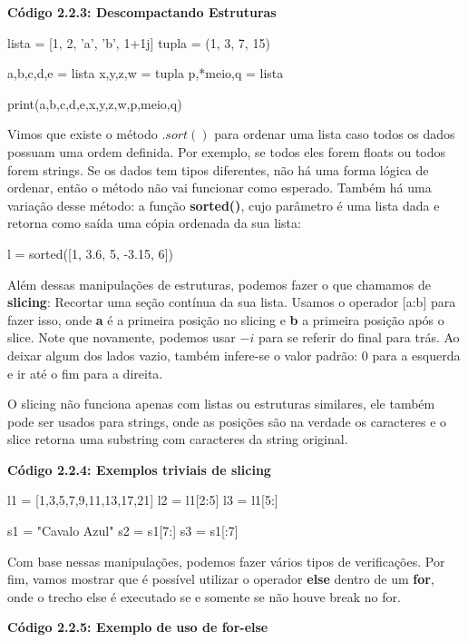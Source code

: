 \documentclass[11pt, a4paper]{article}
\begin{document}
\textbf{Código 2.2.3: Descompactando Estruturas}

\begin{code}
lista = [1, 2, 'a', 'b', 1+1j]
tupla = (1, 3, 7, 15)

a,b,c,d,e = lista
x,y,z,w = tupla
p,*meio,q = lista

print(a,b,c,d,e,x,y,z,w,p,meio,q)
\end{code}

Vimos que existe o método \(.sort()\) para ordenar uma lista caso todos os dados possuam uma ordem definida. Por exemplo, se todos eles forem floats ou todos forem strings. Se os dados tem tipos diferentes, não há uma forma lógica de ordenar, então o método não vai funcionar como esperado. Também há uma variação desse método: a função \textbf{sorted()}, cujo parâmetro é uma lista dada e retorna como saída uma cópia ordenada da sua lista:

\begin{code}
    l = sorted([1, 3.6, 5, -3.15, 6])
\end{code}

Além dessas manipulações de estruturas, podemos fazer o que chamamos de \textbf{slicing}: Recortar uma seção contínua da sua lista. Usamos o operador [a:b] para fazer isso, onde \textbf{a} é a primeira posição no slicing e \textbf{b} a primeira posição após o slice. Note que novamente, podemos usar \(-i\) para se referir do final para trás. Ao deixar algum dos lados vazio, também infere-se o valor padrão: 0 para a esquerda e ir até o fim para a direita. 

O slicing não funciona apenas com listas ou estruturas similares, ele também pode ser usados para strings, onde as posições são na verdade os caracteres e o slice retorna uma substring com caracteres da string original. 

\textbf{Código 2.2.4: Exemplos triviais de slicing}

\begin{code}
    l1 = [1,3,5,7,9,11,13,17,21]
    l2 = l1[2:5]
    l3 = l1[5:]

    s1 = "Cavalo Azul"
    s2 = s1[7:]
    s3 = s1[:7]
\end{code}

Com base nessas manipulações, podemos fazer vários tipos de verificações. Por fim, vamos mostrar que é possível utilizar o operador \textbf{else} dentro de um \textbf{for}, onde o trecho else é executado se e somente se não houve break no for.

\textbf{Código 2.2.5: Exemplo de uso de for-else}
\end{document}

